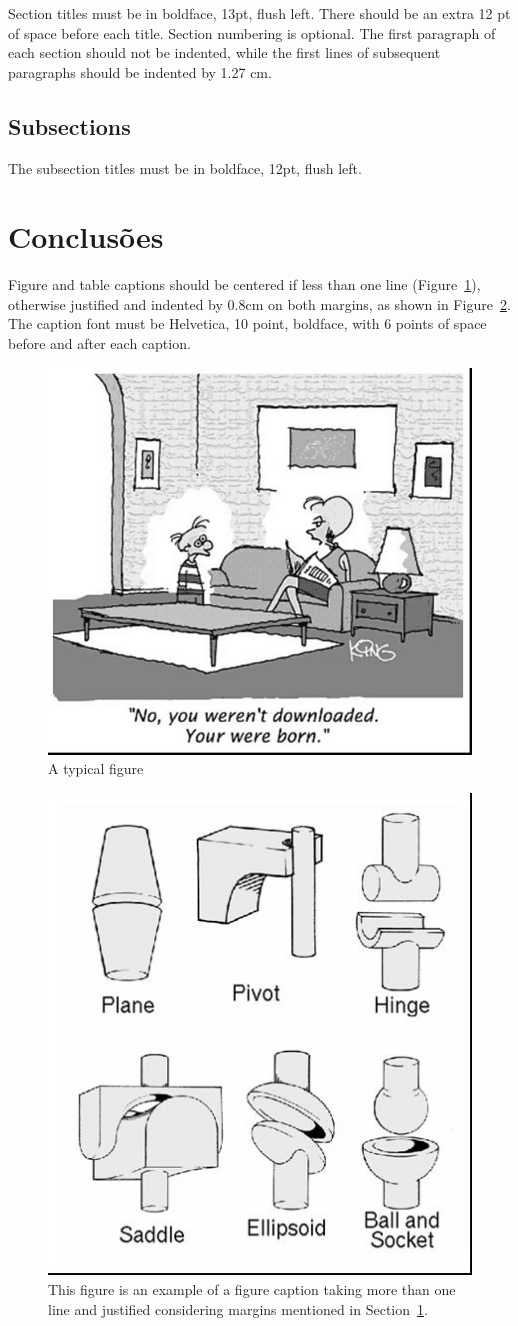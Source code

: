 \documentclass[12pt]{article}
\begin{document}
Section titles must be in boldface, 13pt, flush left. There should be an extra
12 pt of space before each title. Section numbering is optional. The first
paragraph of each section should not be indented, while the first lines of
subsequent paragraphs should be indented by 1.27 cm.

\subsection{Subsections}

The subsection titles must be in boldface, 12pt, flush left.

\section{Conclusões}\label{sec:figs}


Figure and table captions should be centered if less than one line
(Figure~\ref{fig:exampleFig1}), otherwise justified and indented by 0.8cm on
both margins, as shown in Figure~\ref{fig:exampleFig2}. The caption font must
be Helvetica, 10 point, boldface, with 6 points of space before and after each
caption.

\begin{figure}[ht]
\centering
\includegraphics[width=.5\textwidth]{fig1.jpg}
\caption{A typical figure}
\label{fig:exampleFig1}
\end{figure}

\begin{figure}[ht]
\centering
\includegraphics[width=.3\textwidth]{fig2.jpg}
\caption{This figure is an example of a figure caption taking more than one
  line and justified considering margins mentioned in Section~\ref{sec:figs}.}
\label{fig:exampleFig2}
\end{figure}
\end{document}
